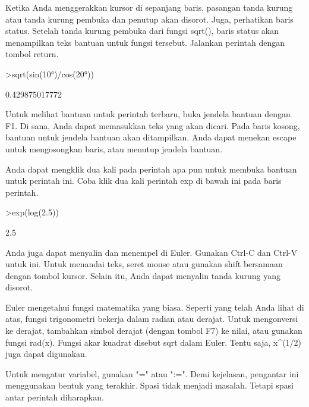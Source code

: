 \documentclass[a4paper,10pt]{article}
\begin{document}
\begin{eulernotebook}
\begin{eulercomment}
Ketika Anda menggerakkan kursor di sepanjang baris, pasangan tanda
kurung atau tanda kurung pembuka dan penutup akan disorot. Juga,
perhatikan baris status. Setelah tanda kurung pembuka dari fungsi
sqrt(), baris status akan menampilkan teks bantuan untuk fungsi
tersebut. Jalankan perintah dengan tombol return.
\end{eulercomment}
\begin{eulerprompt}
>sqrt(sin(10°)/cos(20°))
\end{eulerprompt}
\begin{euleroutput}
  0.429875017772
\end{euleroutput}
\begin{eulercomment}
Untuk melihat bantuan untuk perintah terbaru, buka jendela bantuan
dengan F1. Di sana, Anda dapat memasukkan teks yang akan dicari. Pada
baris kosong, bantuan untuk jendela bantuan akan ditampilkan. Anda
dapat menekan escape untuk mengosongkan baris, atau menutup jendela
bantuan.

Anda dapat mengklik dua kali pada perintah apa pun untuk membuka
bantuan untuk perintah ini. Coba klik dua kali perintah exp di bawah
ini pada baris perintah.
\end{eulercomment}
\begin{eulerprompt}
>exp(log(2.5))
\end{eulerprompt}
\begin{euleroutput}
  2.5
\end{euleroutput}
\begin{eulercomment}
Anda juga dapat menyalin dan menempel di Euler. Gunakan Ctrl-C dan
Ctrl-V untuk ini. Untuk menandai teks, seret mouse atau gunakan shift
bersamaan dengan tombol kursor. Selain itu, Anda dapat menyalin tanda
kurung yang disorot.
\end{eulercomment}
\begin{eulercomment}

\end{eulercomment}
\begin{eulercomment}
Euler mengetahui fungsi matematika yang biasa. Seperti yang telah Anda
lihat di atas, fungsi trigonometri bekerja dalam radian atau derajat.
Untuk mengonversi ke derajat, tambahkan simbol derajat (dengan tombol
F7) ke nilai, atau gunakan fungsi rad(x). Fungsi akar kuadrat disebut
sqrt dalam Euler. Tentu saja, x\textasciicircum{}(1/2) juga dapat digunakan.

Untuk mengatur variabel, gunakan "=" atau ":=". Demi kejelasan,
pengantar ini menggunakan bentuk yang terakhir. Spasi tidak menjadi
masalah. Tetapi spasi antar perintah diharapkan.


\end{eulercomment}
\end{eulernotebook}
\end{document}
